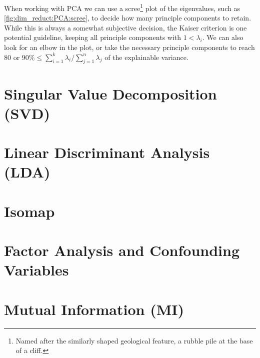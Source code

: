 When working with PCA we can use a
scree\footnote{Named after the similarly shaped geological feature, a rubble pile at the base of a cliff.} plot \cite{scree}
of the eigenvalues, such as \cref{fig:dim_reduct:PCA:scree},
to decide how many principle components to retain.
While this is always a somewhat subjective decision,
the Kaiser criterion is one potential guideline,
keeping all principle components with $1 < \lambda_{i}$.
We can also look for an elbow in the plot,
or take the necessary principle components to reach
\si{80}{\percent} or $\si{90}{\percent} \leq \sum_{i=1}^{k} \lambda_{i} / \sum_{j=1}^{n} \lambda_{j}$ of the explainable variance.

\section{Singular Value Decomposition (SVD)}
\label{dim_reduct:SVD}

\section{Linear Discriminant Analysis (LDA)}
\label{dim_reduct:LDA}


\section{Isomap}
\label{dim_reduct:isomap}

\section{Factor Analysis and Confounding Variables}
\label{dim_reduct:factor_ana}

\section{Mutual Information (MI)}
\label{dim_reduct:MI}

